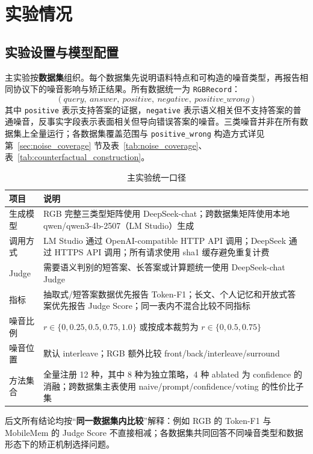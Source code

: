\documentclass[UTF8,zihao=-4]{ctexart}
\begin{document}
\section{实验情况}

\subsection{实验设置与模型配置}

主实验按\textbf{数据集}组织。每个数据集先说明语料特点和可构造的噪音类型，再报告相同协议下的噪音影响与矫正结果。所有数据统一为 \texttt{RGBRecord}：
\[
  (query,\ answer,\ positive,\ negative,\ positive\_wrong)
\]
其中 \texttt{positive} 表示支持答案的证据，\texttt{negative} 表示语义相关但不支持答案的普通噪音，反事实字段表示表面相关但导向错误答案的噪音。三类噪音并非在所有数据集上全量运行；各数据集覆盖范围与 \texttt{positive\_wrong} 构造方式详见第~\ref{sec:noise_coverage} 节及表~\ref{tab:noise_coverage}、表~\ref{tab:counterfactual_construction}。

\begin{table}[H]
  \centering
  \caption{主实验统一口径}
  \small
  \begin{tabularx}{\textwidth}{lY}
    \toprule
    项目 & 说明 \\
    \midrule
    生成模型 & RGB 完整三类型矩阵使用 DeepSeek-chat；跨数据集矩阵使用本地 qwen/qwen3-4b-2507（LM Studio）生成 \\
    调用方式 & LM Studio 通过 OpenAI-compatible HTTP API 调用；DeepSeek 通过 HTTPS API 调用；所有请求使用 sha1 缓存避免重复计费 \\
    Judge & 需要语义判别的短答案、长答案或计算题统一使用 DeepSeek-chat Judge \\
    指标 & 抽取式/短答案数据优先报告 Token-F1；长文、个人记忆和开放式答案优先报告 Judge Score；同一表内不混合比较不同指标 \\
    噪音比例 & $r \in \{0,0.25,0.5,0.75,1.0\}$ 或按成本裁剪为 $r \in \{0,0.5,0.75\}$ \\
    噪音位置 & 默认 interleave；RGB 额外比较 front/back/interleave/surround \\
    方法集合 & 全量注册 12 种，其中 8 种为独立策略，4 种 ablated 为 confidence 的消融；跨数据集主表使用 naive/prompt/confidence/voting 的性价比子集 \\
    \bottomrule
  \end{tabularx}
\end{table}

后文所有结论均按“\textbf{同一数据集内比较}”解释：例如 RGB 的 Token-F1 与 MobileMem 的 Judge Score 不直接相减；各数据集共同回答不同噪音类型和数据形态下的矫正机制选择问题。
\end{document}
